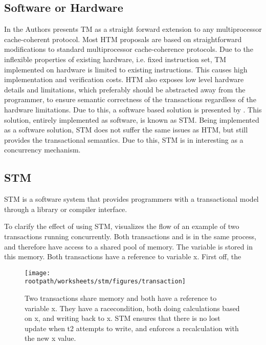 \subsection{Software or Hardware}
In \cite{herlihy1993transactional} the Authors presents \ac{TM} as a straight forward extension to any multiprocessor cache-coherent protocol. Most \ac{HTM} proposals are based on straightforward modifications to standard multiprocessor cache-coherence protocols\cite{scott2011sync}. Due to the inflexible properties of existing hardware, i.e. fixed instruction set, \ac{TM} implemented on hardware is limited to existing instructions. This causes high implementation and verification costs\cite{cascaval2008software}. \ac{HTM} also exposes low level hardware details and limitations\cite{scott2011sync}, which preferably should be abstracted away from the programmer, to ensure semantic correctness of the transactions regardless of the hardware limitations. Due to this, a software based solution is presented by \cite{shavit1997software}. This solution, entirely implemented as software, is known as \acl{STM}. Being implemented as a software solution, \ac{STM} does not suffer the same issues as \ac{HTM}, but still provides the transactional semantics. Due to this, \ac{STM} is in interesting as a concurrency mechanism.

\subsection{\ac{STM}}
STM is a software system that provides programmers with a transactional model through a library or compiler interface\cite{scott2011sync}.

To clarify the effect of using \ac{STM},  visualizes the flow of an example of two transactions running concurrently. Both transactions  and  is in the same process, and therefore have access to a shared pool of memory. The variable  is stored in this memory. Both transactions have a reference to variable x. First off, the 

\begin{figure}[h!]
\centering
\texttt{[image: \\rootpath/worksheets/stm/figures/transaction]}
\caption{Two transactions share memory and both have a reference to variable x. They have a racecondition, both doing calculations based on x, and writing back to x. \ac{STM} ensures that there is no lost update when t2 attempts to write, and enforces a recalculation with the new x value.}\label{fig:transaction}
\end{figure}


